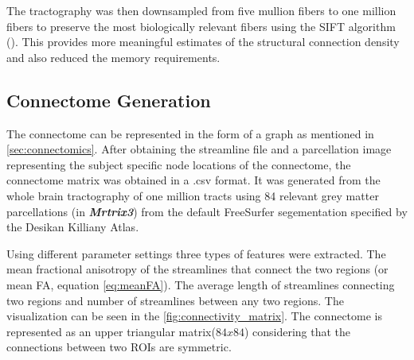 \documentclass[msthesis.tex]{subfiles}
\begin{document}
The tractography was then downsampled from five mullion fibers to one million fibers to preserve the most biologically relevant fibers using the SIFT algorithm (\cite{smith2013sift}). This provides more meaningful estimates of the structural connection density and also reduced the memory requirements. 

\subsection{Connectome Generation}
\label{subsec:connectomegeneration}
The connectome can be represented in the form of a graph as mentioned in \autoref{sec:connectomics}. After obtaining the streamline file and a parcellation image representing the subject specific node locations of the connectome, the connectome matrix was obtained in a .csv format. It was generated from the whole brain tractography of one million tracts using 84 relevant grey matter parcellations (in \textit{\textbf{Mrtrix3}}) from the default FreeSurfer segementation specified by the Desikan Killiany Atlas. 

Using different parameter settings three types of features were extracted. The mean fractional anisotropy of the streamlines that connect the two regions (or mean FA, equation \autoref{eq:meanFA}). The average length of streamlines connecting two regions and number of streamlines between any two regions. The visualization can be seen in the \autoref{fig:connectivity_matrix}. The connectome is represented as an upper triangular matrix($84 x 84$) considering that the connections between two ROIs are symmetric.
\end{document}
